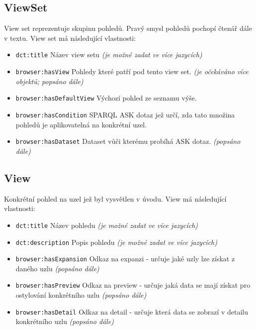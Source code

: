 \subsection{ViewSet} \label{pozadavky-view-sets}
View set reprezentuje skupinu pohledů. Pravý smysl pohledů pochopí čtenář dále v textu. View set má následující vlastnosti:
\begin{itemize}
    \item \texttt{dct:title} Název view setu \textit{(je možné zadat ve více jazycích)}
    \item \texttt{browser:hasView} Pohledy které patří pod tento view set. \textit{(je očekáváno více objektů; popsáno dále)}
    \item \texttt{browser:hasDefaultView} Výchozí pohled ze seznamu výše.
    \item \texttt{browser:hasCondition} SPARQL ASK dotaz jež určí, zda tato množina pohledů je aplikovatelná na konkrétní uzel.
    \item \texttt{browser:hasDataset} Dataset vůči kterému probíhá ASK dotaz. \textit{(popsáno dále)}
\end{itemize}

\subsection{View} \label{pozadavky-view}
Konkrétní pohled na uzel jež byl vysvětlen v úvodu. View má následující vlastnosti:

\begin{itemize}
    \item \texttt{dct:title} Název pohledu \textit{(je možné zadat ve více jazycích)}
    \item \texttt{dct:description} Popis pohledu \textit{(je možné zadat ve více jazycích)}
    \item \texttt{browser:hasExpansion} Odkaz na expanzi - určuje jaké uzly lze získat z daného uzlu \textit{(popsáno dále)}
    \item \texttt{browser:hasPreview} Odkaz na preview - určuje jaká data se mají získat pro ostylování konkrétního uzlu \textit{(popsáno dále)}
    \item \texttt{browser:hasDetail} Odkaz na detail - určuje která data se zobrazí v detailu konkrétního uzlu \textit{(popsáno dále)}
\end{itemize}

